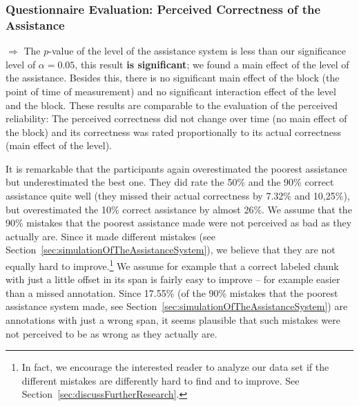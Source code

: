 	\subsubsection{Questionnaire Evaluation: Perceived Correctness of the Assistance}
		\(\Rightarrow\) The \(p\)-value of the level of the assistance system is less than our significance level of \(\alpha = 0.05\), this result \textbf{is significant}; we found a main effect of the level of the assistance. Besides this, there is no significant main effect of the block (the point of time of measurement) and no significant interaction effect of the level and the block. These results are comparable to the evaluation of the perceived reliability: The perceived correctness did not change over time (no main effect of the block) and its correctness was rated proportionally to its actual correctness (main effect of the level).

		It is remarkable that the participants again overestimated the poorest assistance but underestimated the best one. They did rate the 50\% and the 90\% correct assistance quite well (they missed their actual correctness by 7.32\% and 10,25\%), but overestimated the 10\% correct assistance by almost 26\%. We assume that the 90\% mistakes that the poorest assistance made were not perceived as bad as they actually are. Since it made different mistakes (see Section~\ref{sec:simulationOfTheAssistanceSystem}), we believe that they are not equally hard to improve.\footnote{In fact, we encourage the interested reader to analyze our data set if the different mistakes are differently hard to find and to improve. See Section~\ref{sec:discussFurtherResearch}.} We assume for example that a correct labeled chunk with just a little offset in its span is fairly easy to improve -- for example easier than a missed annotation. Since 17.55\% (of the 90\% mistakes that the poorest assistance system made, see Section~\ref{sec:simulationOfTheAssistanceSystem}) are annotations with just a wrong span, it seems plausible that such mistakes were not perceived to be as wrong as they actually are.
